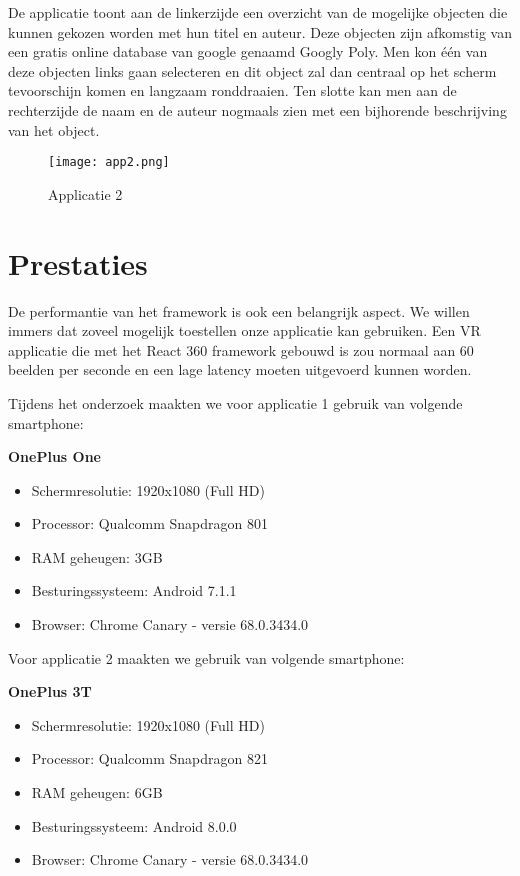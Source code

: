 De applicatie toont aan de linkerzijde een overzicht van de mogelijke objecten die kunnen gekozen worden met hun titel en auteur. Deze objecten zijn afkomstig van een gratis online database van google genaamd Googly Poly. Men kon één van deze objecten links gaan selecteren en dit object zal dan centraal op het scherm tevoorschijn komen en langzaam ronddraaien. Ten slotte kan men aan de rechterzijde de naam en de auteur nogmaals zien met een bijhorende beschrijving van het object.

\begin{figure}[H]
	\centering
	\texttt{[image: app2.png]}
	\caption{Applicatie 2}
	\label{fig:app2}
\end{figure}

\section{Prestaties}
\label{sec:prestaties}
De performantie van het framework is ook een belangrijk aspect. We willen immers dat zoveel mogelijk toestellen onze applicatie kan gebruiken. Een VR applicatie die met het React 360 framework gebouwd is zou normaal aan 60 beelden per seconde en een lage latency moeten uitgevoerd kunnen worden.

Tijdens het onderzoek maakten we voor applicatie 1 gebruik van volgende smartphone:

\textbf{OnePlus One }
\begin{itemize}
	\item Schermresolutie: 1920x1080 (Full HD)
	\item Processor: Qualcomm Snapdragon 801
	\item RAM geheugen: 3GB
	\item Besturingssysteem: Android 7.1.1
	\item Browser: Chrome Canary - versie 68.0.3434.0
\end{itemize}

Voor applicatie 2 maakten we gebruik van volgende smartphone:

\textbf{OnePlus 3T}
\begin{itemize}
	\item Schermresolutie: 1920x1080 (Full HD)
	\item Processor: Qualcomm Snapdragon 821
	\item RAM geheugen: 6GB
	\item Besturingssysteem: Android 8.0.0
	\item Browser: Chrome Canary - versie 68.0.3434.0
\end{itemize}

